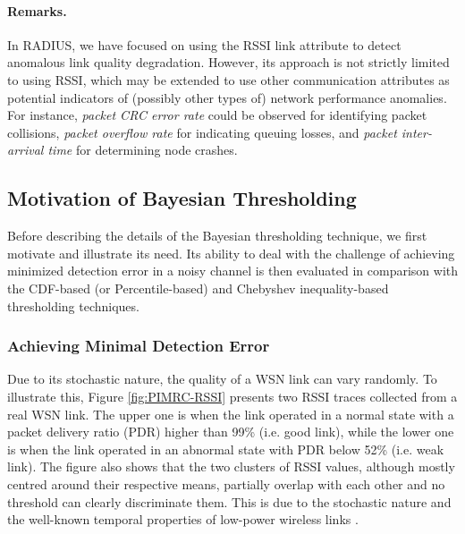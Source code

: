\paragraph{Remarks.} In RADIUS, we have focused on using the RSSI link attribute to detect anomalous link quality degradation. However, its approach is not strictly limited to using RSSI, which may be extended to use other communication attributes as potential indicators of (possibly other types of) network performance anomalies. For instance, \textit{packet CRC error rate} could be observed for identifying packet collisions, \textit{packet overflow rate} for indicating queuing losses, and \textit{packet inter-arrival time} for determining node crashes. %

\subsection{Motivation of Bayesian Thresholding} \label{sec:motivationBayes}

Before describing the details of the Bayesian thresholding technique, we first motivate and illustrate its need. Its ability to deal with the challenge of achieving minimized detection error in a noisy channel is then evaluated in comparison with the CDF-based (or Percentile-based) and Chebyshev inequality-based thresholding techniques.

\subsubsection{Achieving Minimal Detection Error} \label{sec:problem}
	
Due to its stochastic nature, the quality of a WSN link can vary randomly. To illustrate this, Figure \ref{fig:PIMRC-RSSI} presents two RSSI traces collected from a real WSN link. The upper one is when the link operated in a normal state with a packet delivery ratio (PDR) higher than 99\% (i.e. good link), while the lower one is when the link operated in an abnormal state with PDR below 52\% (i.e. weak link). The figure also shows that the two clusters of RSSI values, although mostly centred around their respective means, partially overlap with each other and no threshold can clearly discriminate them. This is due to the stochastic nature and the well-known temporal properties of low-power wireless links \cite{2893729}. 


